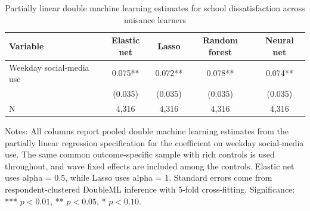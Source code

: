 \begin{table}[!htbp]
\centering
\caption{Partially linear double machine learning estimates for school dissatisfaction across nuisance learners}
\label{tab:dml_school_methods}
\begin{tabular}{lcccc}
\hline
Variable & Elastic net & Lasso & Random forest & Neural net
\\
\hline
Weekday social-media use & 0.075** & 0.072** & 0.078** & 0.074**
\\
 & (0.035) & (0.035) & (0.035) & (0.035)
\\
N & 4,316 & 4,316 & 4,316 & 4,316
\\
\hline
\end{tabular}
\begin{minipage}{0.95\textwidth}
\footnotesize Notes: All columns report pooled double machine learning estimates from the partially linear regression specification for the coefficient on weekday social-media use. The same common outcome-specific sample with rich controls is used throughout, and wave fixed effects are included among the controls. Elastic net uses alpha = 0.5, while Lasso uses alpha = 1. Standard errors come from respondent-clustered DoubleML inference with 5-fold cross-fitting. Significance: *** \(p < 0.01\), ** \(p < 0.05\), * \(p < 0.10\).
\end{minipage}
\end{table}
